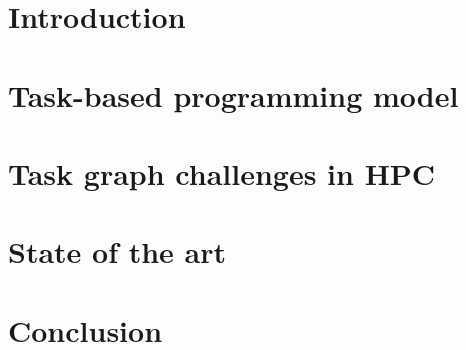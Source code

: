 \documentclass[english,phd]{diploma}
\begin{document}
\MakeTitlePages

\listoffigures
\clearpage

\listoftables
\clearpage

\chapter{Introduction}
\label{ch:Introduction}


\chapter{Task-based programming model}
\label{ch:taskgraphs}


\chapter{Task graph challenges in HPC}
\label{ch:challenges}


\chapter{State of the art}
\label{ch:sota}


\chapter{Conclusion}
\label{ch:conclusion}




\appendix
\end{document}
